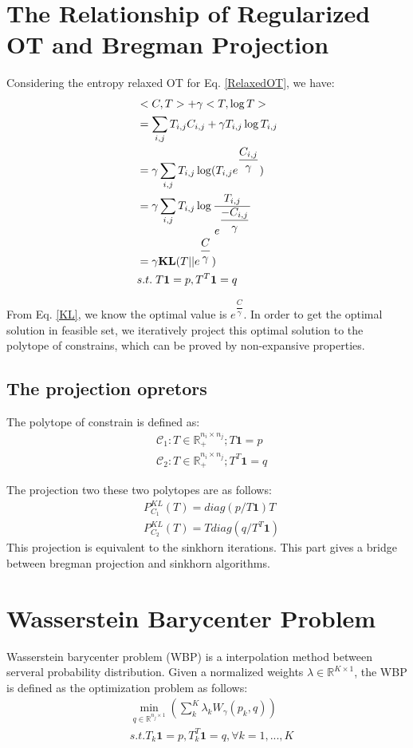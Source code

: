 \documentclass{article}
\theoremstyle{plain}
\theoremstyle{definition}
\begin{document}
\section{The Relationship of Regularized OT and Bregman Projection}
Considering the entropy relaxed OT for Eq. \ref{RelaxedOT}, we have:
\begin{align}
&<C,T> + \gamma <T,\log T> \nonumber\\
&= \sum_{i,j}T_{i,j}C_{i,j} + \gamma T_{i,j}\log T_{i,j} \nonumber\\
&= \gamma \sum_{i,j}T_{i,j} \log(T_{i,j}e^{\dfrac{C_{i,j}}{\gamma}}) \nonumber\\
&= \gamma \sum_{i,j}T_{i,j} \log \dfrac{T_{i,j}}{e^{\dfrac{-C_{i,j}}{\gamma}}} \nonumber\\
&= \gamma \mathbf{KL}(T||e^{\dfrac{C}{\gamma}})\\ \label{KL}
&s.t. \hspace{1mm} T\mathbf{1} = p, T^{T} \mathbf{1} = q 
\end{align}

From Eq. \ref{KL}, we know the optimal value is $e^{\dfrac{C}{\gamma}}$. In order to get the optimal solution in feasible set, we iteratively project this optimal solution to the polytope of constrains, which can be proved by non-expansive properties.

\subsection{The projection opretors}
The polytope of constrain is defined as:
\begin{align}
&\mathcal{C}_{1}: {T \in \mathbb{R}_{+}^{n_{i} \times n_{j}}}; T\mathbf{1} = p \nonumber \\
&\mathcal{C}_{2}: {T \in \mathbb{R}_{+}^{n_{i} \times n_{j}}}; T^{T}\mathbf{1} = q \label{polytope}
\end{align}

The projection two these two polytopes are as follows:
\begin{align}
&P_{C_{1}}^{KL}(T) = diag(p/ T\mathbf{1}) T\\
&P_{C_{2}}^{KL}(T) = T diag(q / T^{T}\mathbf{1}) \label{projector}
\end{align}
This projection is equivalent to the sinkhorn iterations. This part gives a bridge between bregman projection and sinkhorn algorithms.
\section{Wasserstein Barycenter Problem}
Wasserstein barycenter problem (WBP) is a interpolation method between serveral probability distribution. Given a normalized weights $\lambda \in \mathbb{R}^{K \times 1}$, the WBP is defined as the optimization problem as follows:
\begin{align}
&\min_{q\in \mathbb{R}^{n_{j} \times 1}}\left(\sum_{k}^{K}\lambda_{k}W_{\gamma}(p_{k},q)\right)\\
&s.t. T_{k}\mathbf{1} = p,T_{k}^{T}\mathbf{1} = q, \forall k = 1,...,K
\end{align}
\end{document}
